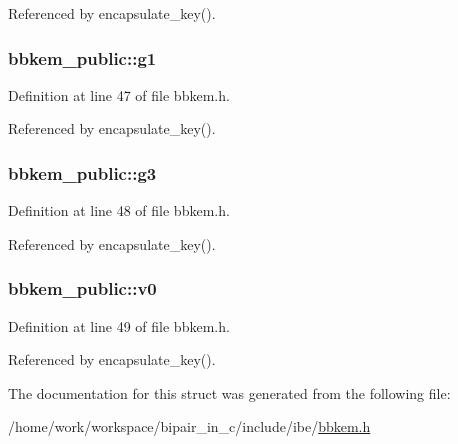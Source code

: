 Referenced by encapsulate\-\_\-key().

\hypertarget{structbbkem__public_a8cba8a4f4756ce7e28951036268c474b}{
\subsubsection[{g1}]{ bbkem\-\_\-public\-::g1}}\label{structbbkem__public_a8cba8a4f4756ce7e28951036268c474b}


Definition at line 47 of file bbkem.\-h.



Referenced by encapsulate\-\_\-key().

\hypertarget{structbbkem__public_af753ec02399a5af86b58aeedc890bdcd}{
\subsubsection[{g3}]{ bbkem\-\_\-public\-::g3}}\label{structbbkem__public_af753ec02399a5af86b58aeedc890bdcd}


Definition at line 48 of file bbkem.\-h.



Referenced by encapsulate\-\_\-key().

\hypertarget{structbbkem__public_a3debd6056f9930f3f521f72124b8c9cb}{
\subsubsection[{v0}]{ bbkem\-\_\-public\-::v0}}\label{structbbkem__public_a3debd6056f9930f3f521f72124b8c9cb}


Definition at line 49 of file bbkem.\-h.



Referenced by encapsulate\-\_\-key().



The documentation for this struct was generated from the following file\-:\begin{DoxyCompactItemize}
\item 
/home/work/workspace/bipair\-\_\-in\-\_\-c/include/ibe/\hyperlink{bbkem_8h}{bbkem.\-h}\end{DoxyCompactItemize}
